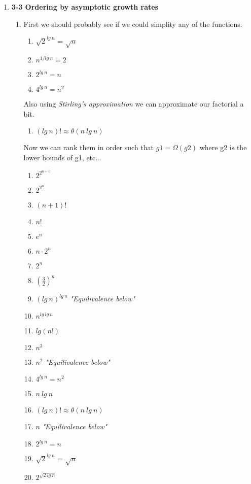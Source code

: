 \documentclass{article}
\begin{document}
\begin{enumerate}
    \item \textbf{3-3 Ordering by asymptotic growth rates}
    \begin{enumerate}
      \item First we should probably see if we could simplity any of the functions.
      \begin{enumerate}
        \item $\sqrt{2}^{lg\:n}$ = $\sqrt{n}$
        \item $n^{1/lg\:n} = 2$
        \item $2^{lg\:n} = n$
        \item $4^{lg\:n} = n^2$
      \end{enumerate}
      Also using \textit{Stirling's approximation} we can approximate our factorial a bit.
      \begin{enumerate}
        \item $(lg\:n)! \approx \theta(n\:lg\:n)$
      \end{enumerate}
      Now we can rank them in order such that $g1 = \Omega{(g2)}$ where g2 is the lower bounds of g1, etc...
      \begin{enumerate}
        \item $2^{2^{n+1}}$
        \item $2^{2^n}$
        \item $(n+1)!$ 
        \item $n!$
        \item $e^n$
        \item $n \cdot 2^n$
        \item $2^n$
        \item $(\frac{3}{2})^n$
        \item $(lg\:n)^{lg\:n}$ \textit{"Equilivalence below"}
        \item $n^{lg\:lg\:n}$
        \item $lg(n!)$
        \item $n^3$
        \item $n^2$ \textit{"Equilivalence below"}
        \item $4^{lg\:n} = n^2$
        \item $n\:lg\:n$
        \item $(lg\:n)! \approx \theta(n\:lg\:n)$
        \item $n$ \textit{"Equilivalence below"}
        \item $2^{lg\:n} = n$
        \item $\sqrt{2}^{lg\:n}$ = $\sqrt{n}$
        \item $2^{\sqrt{2\:lg\:n}}$

\end{enumerate}
\end{enumerate}
\end{enumerate}
\end{document}
